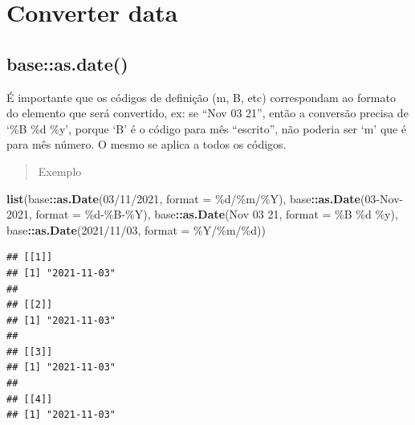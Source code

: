 \documentclass[
]{book}
\newenvironment{Shaded}{\begin{snugshade}}{\end{snugshade}}
\newcommand{\AttributeTok}[1]{\textcolor[rgb]{0.13,0.29,0.53}{#1}}
\newcommand{\FunctionTok}[1]{\textcolor[rgb]{0.13,0.29,0.53}{\textbf{#1}}}
\newcommand{\NormalTok}[1]{#1}
\newcommand{\SpecialCharTok}[1]{\textcolor[rgb]{0.81,0.36,0.00}{\textbf{#1}}}
\newcommand{\StringTok}[1]{\textcolor[rgb]{0.31,0.60,0.02}{#1}}
\theoremstyle{definition}
\theoremstyle{definition}
\theoremstyle{definition}
\theoremstyle{definition}
\theoremstyle{remark}
\begin{document}
\hypertarget{converter-data}{%
\section{Converter data}\label{converter-data}}

\hypertarget{baseas.date}{%
\subsection{base::as.date()}\label{baseas.date}}

É importante que os códigos de definição (m, B, etc) correspondam ao formato do elemento que será convertido, ex: se ``Nov 03 21'', então a conversão precisa de `\%B \%d \%y', porque `B' é o código para mês ``escrito'', não poderia ser `m' que é para mês número. O mesmo se aplica a todos os códigos.

\begin{quote}
Exemplo
\end{quote}

\begin{Shaded}
\begin{Highlighting}[]
\FunctionTok{list}\NormalTok{(base}\SpecialCharTok{::}\FunctionTok{as.Date}\NormalTok{(}\StringTok{\textquotesingle{}03/11/2021\textquotesingle{}}\NormalTok{,  }\AttributeTok{format =} \StringTok{\textquotesingle{}\%d/\%m/\%Y\textquotesingle{}}\NormalTok{),}
\NormalTok{     base}\SpecialCharTok{::}\FunctionTok{as.Date}\NormalTok{(}\StringTok{\textquotesingle{}03{-}Nov{-}2021\textquotesingle{}}\NormalTok{, }\AttributeTok{format =} \StringTok{\textquotesingle{}\%d{-}\%B{-}\%Y\textquotesingle{}}\NormalTok{),}
\NormalTok{     base}\SpecialCharTok{::}\FunctionTok{as.Date}\NormalTok{(}\StringTok{\textquotesingle{}Nov 03 21\textquotesingle{}}\NormalTok{,   }\AttributeTok{format =} \StringTok{\textquotesingle{}\%B \%d \%y\textquotesingle{}}\NormalTok{),}
\NormalTok{     base}\SpecialCharTok{::}\FunctionTok{as.Date}\NormalTok{(}\StringTok{\textquotesingle{}2021/11/03\textquotesingle{}}\NormalTok{,  }\AttributeTok{format =} \StringTok{\textquotesingle{}\%Y/\%m/\%d\textquotesingle{}}\NormalTok{))}
\end{Highlighting}
\end{Shaded}

\begin{verbatim}
## [[1]]
## [1] "2021-11-03"
## 
## [[2]]
## [1] "2021-11-03"
## 
## [[3]]
## [1] "2021-11-03"
## 
## [[4]]
## [1] "2021-11-03"
\end{verbatim}
\end{document}
